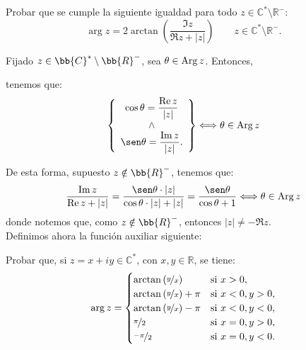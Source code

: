 \begin{ejercicio}
    Probar que se cumple la siguiente igualdad para todo $z \in \mathbb{C}^\ast \setminus \mathbb{R}^-$:
    \[
        \arg z = 2\arctan\left(\dfrac{\Im z}{\Re z + |z|}\right)\qquad z\in \mathbb{C}^\ast \setminus \mathbb{R}^-.
    \]

    Fijado $z\in \bb{C}^*\setminus \bb{R}^-$, sea $\theta\in \operatorname{Arg} z$. Entonces,
    
    
    tenemos que:
    \begin{equation*}
        \left\{
            \begin{array}{c}
                \cos\theta = \dfrac{\Re z}{|z|} \\ \land \\ \sen\theta = \dfrac{\Im z}{|z|}.
            \end{array}
        \right\}
        \Longleftrightarrow \theta\in \Arg z
    \end{equation*}

    De esta forma, supuesto $z\notin \bb{R}^-$, tenemos que:
    \begin{align*}
        \dfrac{\Im z}{\Re z + |z|}
        = \dfrac{\sen\theta\cdot |z|}{\cos\theta\cdot |z| + |z|}
        = \dfrac{\sen\theta}{\cos\theta + 1}\Longleftrightarrow \theta\in \Arg z
    \end{align*}
    donde notemos que, como $z\notin \bb{R}^-$, entonces $|z|\neq -\Re z$.\\

    Definimos ahora la función auxiliar siguiente:
    \Func{f}{\left]-\pi,\pi\right[}{\bb{R}}{\alpha}{\alpha - 2\arctan\left(\dfrac{\sen\alpha}{\cos\alpha + 1}\right)}
\end{ejercicio}

\begin{ejercicio}
    Probar que, si $z = x+iy \in \mathbb{C}^*$, con $x,y \in \mathbb{R}$, se tiene:
    \[
        \arg z = \begin{cases}
            \arctan\left(\nicefrac{y}{x}\right) & \text{si } x > 0, \\
            \arctan\left(\nicefrac{y}{x}\right) + \pi & \text{si } x < 0, y > 0, \\
            \arctan\left(\nicefrac{y}{x}\right) - \pi & \text{si } x < 0, y < 0, \\
            \nicefrac{\pi}{2} & \text{si } x = 0, y > 0, \\
            \nicefrac{-\pi}{2} & \text{si } x = 0, y < 0.
        \end{cases}
    \]
\end{ejercicio}

